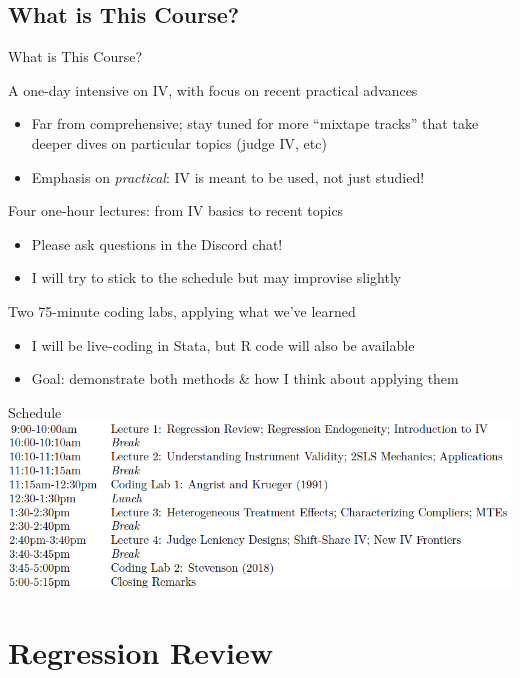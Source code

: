 \documentclass{beamer}
\begin{document}
\subsection{What is This Course?}
\begin{frame}{What is This Course?}

A one-day intensive on IV, with focus on recent practical advances \pause

\begin{itemize}
  \item Far from comprehensive; stay tuned for more ``mixtape tracks'' that take deeper dives on particular topics (judge IV, etc)
  \item Emphasis on \emph{practical}: IV is meant to be used, not just studied!
\end{itemize}\pause\medskip

Four one-hour lectures: from IV basics to recent topics\pause

\begin{itemize}
  \item Please ask questions in the Discord chat!
  \item I will try to stick to the schedule but may improvise slightly
\end{itemize}\pause\medskip

Two 75-minute coding labs, applying what we've learned\pause
\begin{itemize}
  \item I will be live-coding in Stata, but R code will also be available
  \item Goal: demonstrate both methods \& how I think about applying them
\end{itemize}

\end{frame}

\begin{frame}{Schedule}
\includegraphics[scale=0.55]{./lecture_includes/schedule.png}
\end{frame}

\section{Regression Review}
\end{document}
